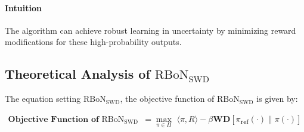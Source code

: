 \paragraph{Intuition}
The algorithm can achieve robust learning in uncertainty by minimizing reward modifications for these high-probability outputs.


\subsection{Theoretical Analysis of $\mathrm{RBoN}_{\mathrm{SWD}}$}\label{sec:WD}

The equation setting $\mathrm{RBoN}_{\mathrm{SWD}}$, the objective function of $\mathrm{RBoN}_{\mathrm{SWD}}$ is given by:


\begin{equation}\label{eq:wdr}
    \begin{aligned}
     \textbf{Objective Function of $\mathrm{RBoN}_{\mathrm{SWD}}$} &= \max_{\pi \in \Pi} \,\, \langle \pi ,R \rangle -\beta \textbf{WD} [\pi_{\textbf{ref}}(\cdot) \| \pi (\cdot)]\\
     \end{aligned}
\end{equation}



